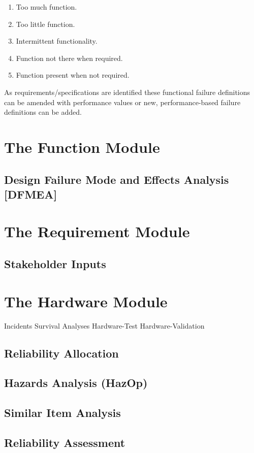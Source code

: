 \documentclass[twoside,12pt,letterpaper,openright]{book}
\begin{document}
\begin{enumerate}
    \item Too much function.
    \item Too little function.
    \item Intermittent functionality.
    \item Function not there when required.
    \item Function present when not required.
\end{enumerate}

\noindent As requirements/specifications are identified these functional 
failure definitions can be amended with performance values or new, 
performance-based failure definitions can be added.

\section{The Function Module}
\subsection{Design Failure Mode and Effects Analysis [DFMEA]}
\section{The Requirement Module}
\subsection{Stakeholder Inputs}
\section{The Hardware Module}

Incidents
Survival Analyses
Hardware-Test
Hardware-Validation

\subsection{Reliability Allocation}
\subsection{Hazards Analysis (HazOp)}
\subsection{Similar Item Analysis}
\subsection{Reliability Assessment}
\end{document}
